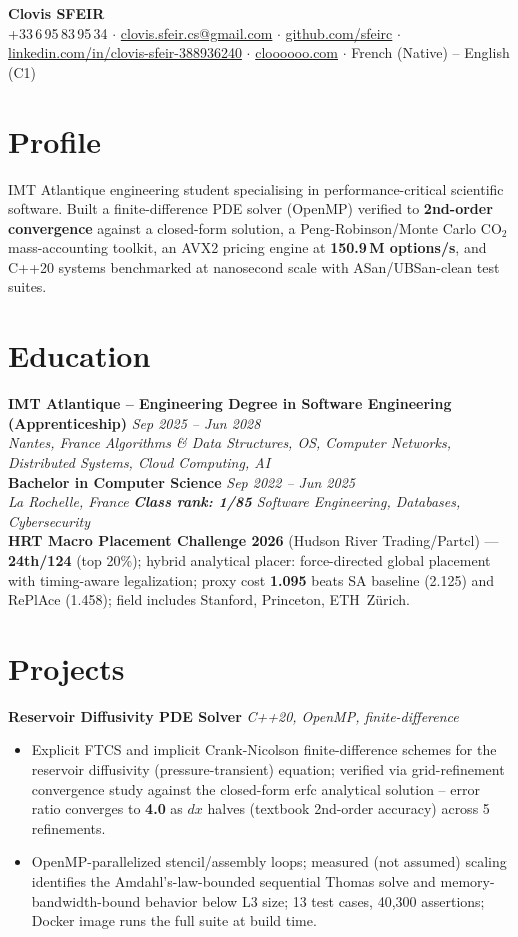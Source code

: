 \documentclass[10pt]{article}
\newcommand{\entry}[4]{%
  \noindent\textbf{#1} \hfill \textit{#2} \\
  \textit{#3} \hfill \textit{#4}\\[-0.22em]
}
\newcommand{\projectentry}[2]{%
  \noindent\textbf{#1} \hfill \textit{#2}\\[-0.3em]
}
\begin{document}
\fontsize{9.3pt}{11pt}\selectfont
\begin{center}
  {\LARGE \textbf{Clovis SFEIR}}\\[0.3em]
  +33\,6\,95\,83\,95\,34 \;$\cdot$\; \href{mailto:clovis.sfeir.cs@gmail.com}{clovis.sfeir.cs@gmail.com} \;$\cdot$\;
  \href{https://github.com/sfeirc}{github.com/sfeirc} \;$\cdot$\;
  \href{https://linkedin.com/in/clovis-sfeir-388936240}{linkedin.com/in/clovis-sfeir-388936240} \;$\cdot$\;
  \href{https://cloooooo.com}{cloooooo.com} \;$\cdot$\; French (Native) -- English (C1)
\end{center}

\section*{Profile}
IMT Atlantique engineering student specialising in performance-critical scientific software. Built a finite-difference PDE solver (OpenMP) verified to \textbf{2nd-order convergence} against a closed-form solution, a Peng-Robinson/Monte Carlo CO$_2$ mass-accounting toolkit, an AVX2 pricing engine at \textbf{150.9\,M options/s}, and C++20 systems benchmarked at nanosecond scale with ASan/UBSan-clean test suites.

\section*{Education}
\entry{IMT Atlantique -- Engineering Degree in Software Engineering (Apprenticeship)}{Sep 2025 -- Jun 2028}{Nantes, France}{Algorithms \& Data Structures, OS, Computer Networks, Distributed Systems, Cloud Computing, AI}
\entry{Bachelor in Computer Science}{Sep 2022 -- Jun 2025}{La Rochelle, France}{\textbf{Class rank: 1/85} \textbar{} Software Engineering, Databases, Cybersecurity}
\noindent\textbf{HRT Macro Placement Challenge 2026} (Hudson River Trading/Partcl) --- \textbf{24th/124} (top 20\%); hybrid analytical placer: force-directed global placement with timing-aware legalization; proxy cost \textbf{1.095} beats SA baseline (2.125) and RePlAce (1.458); field includes Stanford, Princeton, ETH~Z\"urich.

\section*{Projects}

\projectentry{Reservoir Diffusivity PDE Solver}{C++20, OpenMP, finite-difference}
\begin{itemize}
  \item Explicit FTCS and implicit Crank-Nicolson finite-difference schemes for the reservoir diffusivity (pressure-transient) equation; verified via grid-refinement convergence study against the closed-form erfc analytical solution -- error ratio converges to \textbf{4.0} as $dx$ halves (textbook 2nd-order accuracy) across 5 refinements.
  \item OpenMP-parallelized stencil/assembly loops; measured (not assumed) scaling identifies the Amdahl's-law-bounded sequential Thomas solve and memory-bandwidth-bound behavior below L3 size; 13 test cases, 40{,}300 assertions; Docker image runs the full suite at build time.
\end{itemize}
\end{document}
